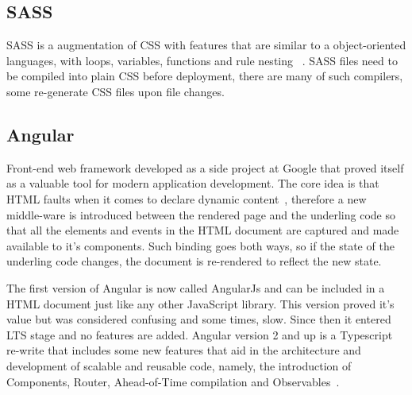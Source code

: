 \subsection{SASS}
\gls{SASS} is a augmentation of CSS with features that are similar to a object-oriented languages, with loops, variables, functions and rule nesting ~\cite{sass}. SASS files need to be compiled into plain CSS before deployment, there are many of such compilers, some re-generate CSS files upon file  changes.

\subsection{Angular}\label{concept:angular}
Front-end web framework developed as a side project at Google that proved itself as a valuable tool for modern application development. The core idea is that \gls{HTML} faults when it comes to declare dynamic content~\cite{angularjs}, therefore a new middle-ware is introduced between the rendered page and the underling code so that all the elements and events in the \gls{HTML} document are captured and made available to it's components. Such binding goes both ways, so if the state of the underling code changes, the document is re-rendered to reflect the new state.

The first version of Angular is now called AngularJs and can be included in a \gls{HTML} document just like any other JavaScript library. This version proved it's value but was considered confusing and some times, slow. Since then it entered \gls{LTS} stage and no features are added. Angular version 2 and up is a Typescript re-write that includes some new features that aid in the architecture and development of scalable and reusable code, namely, the introduction of Components, Router, Ahead-of-Time compilation and Observables~\cite{angular}.

